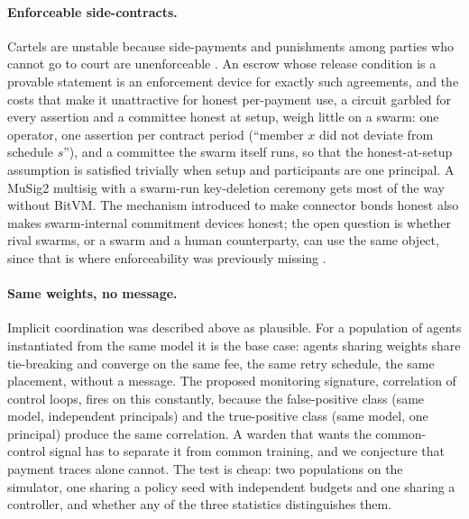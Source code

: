 \documentclass[11pt]{article}
\theoremstyle{plain}
\theoremstyle{definition}
\theoremstyle{remark}
\begin{document}
\paragraph{Enforceable side-contracts.} Cartels are unstable because side-payments and punishments among parties who cannot go to court are unenforceable \citep{stigler1964oligopoly}. An escrow whose release condition is a provable statement is an enforcement device for exactly such agreements, and the costs that make it unattractive for honest per-payment use, a circuit garbled for every assertion and a committee honest at setup, weigh little on a swarm: one operator, one assertion per contract period (``member $x$ did not deviate from schedule $s$''), and a committee the swarm itself runs, so that the honest-at-setup assumption is satisfied trivially when setup and participants are one principal. A MuSig2 multisig with a swarm-run key-deletion ceremony gets most of the way without BitVM. The mechanism introduced to make connector bonds honest also makes swarm-internal commitment devices honest; the open question is whether rival swarms, or a swarm and a human counterparty, can use the same object, since that is where enforceability was previously missing \citep{calvano2020ai}.

\paragraph{Same weights, no message.} Implicit coordination was described above as plausible. For a population of agents instantiated from the same model it is the base case: agents sharing weights share tie-breaking and converge on the same fee, the same retry schedule, the same placement, without a message. The proposed monitoring signature, correlation of control loops, fires on this constantly, because the false-positive class (same model, independent principals) and the true-positive class (same model, one principal) produce the same correlation. A warden that wants the common-control signal has to separate it from common training, and we conjecture that payment traces alone cannot. The test is cheap: two populations on the simulator, one sharing a policy seed with independent budgets and one sharing a controller, and whether any of the three statistics distinguishes them.
\end{document}
